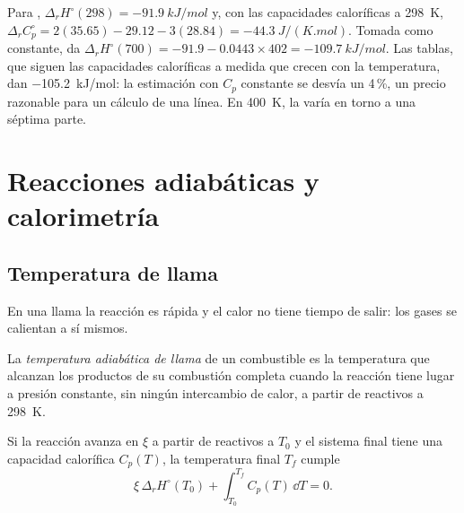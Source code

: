 \begin{example}\label{ex:b2:reaction-enthalpy:kirchhoff}
Para , $\Delta_r H^\circ(298) =
\qty{-91.9}{kJ/mol}$ y, con las capacidades caloríficas a \qty{298}{K},
$\Delta_r C_p^\circ = 2(35.65) - 29.12 - 3(28.84) =
\qty{-44.3}{J/(K.mol)}$. Tomada como constante, da $\Delta_r
H^\circ(700) = -91.9 - 0.0443 \times 402 = \qty{-109.7}{kJ/mol}$. Las tablas,
que siguen las capacidades caloríficas a medida que crecen con la temperatura, dan
\qty{-105.2}{kJ/mol}: la estimación con $C_p$ constante se desvía un 4\,\%, un
precio razonable para un cálculo de una línea. En \qty{400}{K}, la  varía en torno a una séptima parte.
\end{example}

\section{Reacciones adiabáticas y calorimetría}

\subsection*{Temperatura de llama}

En una llama la reacción es rápida y el calor no tiene tiempo de salir: los
gases se calientan a sí mismos.

\begin{definition}\label{def:b2:reaction-enthalpy:flame-temperature}
La \emph{temperatura adiabática de llama}
de un combustible es la temperatura que alcanzan los productos de su
combustión completa cuando la reacción tiene lugar a presión constante, sin
ningún intercambio de calor, a partir de reactivos a \qty{298}{K}.
\end{definition}

\begin{proposition}\label{prop:b2:reaction-enthalpy:flame}
Si la reacción avanza en $\xi$ a partir de reactivos a $T_0$ y el sistema final
tiene una capacidad calorífica $C_p(T)$, la temperatura final $T_f$ cumple
\[
  \xi\,\Delta_r H^\circ(T_0) + \int_{T_0}^{T_f}C_p(T)\,\dd T = 0 .
\]
\end{proposition}

